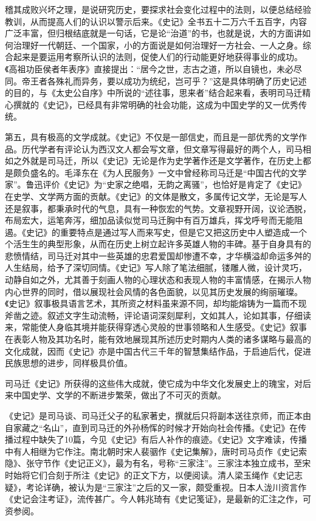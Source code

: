 \documentclass[12pt,UTF8]{ctexbook}
\begin{document}
稽其成败兴坏之理，是说研究历史，要探求社会变化过程中的法则，以便总结经验教训，从而提高人们的认识以警示后来。《史记》全书五十二万六千五百字，内容广泛丰富，但归根结底就是一句话，它是论“治道”的书，也就是说，大的方面讲如何治理好一代朝廷、一个国家，小的方面说是如何治理好一方社会、一人之身。综合起来是要运用考察所认识的法则，促使人们的行动能更好地获得事业的成功。《高祖功臣侯者年表序》直接提出：“居今之世，志古之道，所以自镜也，未必尽同。帝王者各殊礼而异务，要以成功为统纪，岂可乎？”这是具体明确了历史记述的目的，与《太史公自序》中所说的“述往事，思来者”结合起来看，表明司马迁精心撰就的《史记》，已经具有非常明确的社会功能，这成为中国史学的又一优秀传统。

第五，具有极高的文学成就。《史记》不仅是一部信史，而且是一部优秀的文学作品。历代学者有评论认为西汉文人都会写文章，但文章写得最好的两个人，司马相如之外就是司马迁，所以《史记》无论是作为史学著作还是文学著作，在历史上都是颇负盛名的。毛泽东在《为人民服务》一文中曾经称司马迁是“中国古代的文学家”。鲁迅评价《史记》为“史家之绝唱，无韵之离骚”，也恰好是肯定了《史记》在史学、文学两方面的贡献。《史记》的文体是散文，多属传记文学，无论是写人还是叙事，都秉承时代的气息，具有一种恢宏的气势。文章视野开阔，议论洒脱，布局宏大，运笔奔泻，细加品读似觉司马迁胸中有百万雄兵，挥戈呼号而无能阻遏。《史记》的重要特点是通过写人而来写史，但是它又把这历史中人塑造成一个个活生生的典型形象，从而在历史上树立起许多英雄人物的丰碑。基于自身具有的悲愤情结，司马迁对其中一些英雄的忠君爱国却惨遭不幸，才华横溢却命运多舛的人生结局，给予了深切同情。《史记》写人除了笔法细腻，镂雕人微，设计灵巧，动静自如之外，尤其善于刻画人物的心理状态和表现人物的丰富情感，在揭示人物内心世界的同时，借以展现社会风情的各色面貌，以见其历史发展的绚丽璀璨。《史记》叙事极具语言艺术，其所资之材料虽来源不同，却均能熔铸为一篇而不现斧凿之迹。叙述文字生动流畅，评论语词深刻犀利，文如其人，论如其事，仔细读来，常能使人身临其境并能获得穿透心灵般的世事领略和人生感受。《史记》叙事在表彰人物及其功名时，能有效地展现其所述历史时期内人类的诸多谋略与最高的文化成就，因而《史记》亦是中国古代三千年的智慧集结作品，于启迪后代，促进民族思想的进步，同样极具价值。

司马迁《史记》所获得的这些伟大成就，使它成为中华文化发展史上的瑰宝，对后来中国史学、文学的不断进步繁荣，做出了不可灭的贡献。

《史记》是司马谈、司马迁父子的私家著史，撰就后只将副本送往京师，而正本由自家藏之“名山”，直到司马迁的外孙杨恽的时候才开始向社会传播。《史记》在传播过程中缺失了10篇，今见《史记》有后人补作的痕迹。《史记》文字难读，传播中有人相继为它作注。南北朝时宋人裴骃作《史记集解》，唐时司马贞作《史记索隐》、张守节作《史记正义》，最为有名，号称“三家注”。三家注本独立成书，至宋时始将它们合刻于所注《史记》的正文下方，以便阅读。清人梁玉绳作《史记志疑》，考论详确，被认为是“三家注”之后的又一家，颇受重视。日本人泷川资言作《史记会注考证》，流传甚广。今人韩兆琦有《史记笺证》，是最新的汇注之作，可资参阅。
\end{document}
